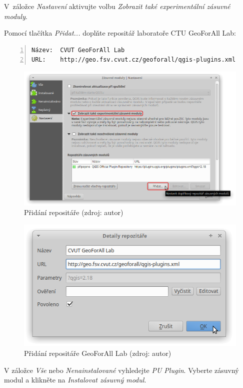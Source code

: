 V~záložce \textit{Nastavení} aktivujte volbu \textit{Zobrazit také
experimentální zásuvné mo\-duly}.

Pomocí tlačítka \textit{Přidat...} doplňte repositář laboratoře
CTU GeoForAll Lab:

\begin{lstlisting}[basicstyle=\footnotesize\ttfamily, backgroundcolor
= \color{light-gray}, numbers=left, columns=fullflexible,
keepspaces=true]
Název:  CVUT GeoForAll Lab
URL:    http://geo.fsv.cvut.cz/geoforall/qgis-plugins.xml
\end{lstlisting}

	\begin{figure}[H] \centering
		\includegraphics[width=.85\textwidth]{./pictures/instalace-pridani_repositare.png}
		\caption[Přidání repositáře]{Přidání repositáře
(zdroj: autor)}
		\label{fig:manual_pridani_repozitare}
 	\end{figure}
 	
	\begin{figure}[H] \centering
		\includegraphics[width=.6\textwidth]{./pictures/instalace-pridani_repositare_geoforall.png}
		\caption[Přidání repositáře GeoForAll Lab]{Přidání
repositáře GeoForAll Lab (zdroj: autor)}
		\label{fig:manual_pridani_repozitare_geoforall_lab}
 	\end{figure}

V záložce \textit{Vše} nebo \textit{Nenainstalované} vyhledejte
\textit{PU Plugin}. Vyberte zásuvný modul a klikněte na
\textit{Instalovat zásuvný modul}.

